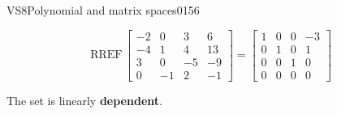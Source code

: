 \begin{exercise}{VS8}{Polynomial and matrix spaces}{0156}
\begin{exerciseAnswer}
 \[
\mathrm{RREF}\, \left[\begin{array}{cccc}
-2 & 0 & 3 & 6 \\
-4 & 1 & 4 & 13 \\
3 & 0 & -5 & -9 \\
0 & -1 & 2 & -1
\end{array}\right] = \left[\begin{array}{cccc}
1 & 0 & 0 & -3 \\
0 & 1 & 0 & 1 \\
0 & 0 & 1 & 0 \\
0 & 0 & 0 & 0
\end{array}\right]
            \] 

 

 The set is linearly \textbf{dependent}. 

 \end{exerciseAnswer}
 \end{exercise}


\newpage




